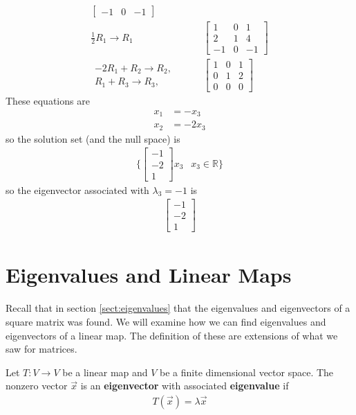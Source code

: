 \begin{example}
\begin{align*}
\begin{bmatrix}
-1 & 0 & -1 
\end{bmatrix} \\
\frac{1}{2}R_1 \rightarrow R_1 & \qquad
\begin{bmatrix}
1 & 0 & 1 \\
2 & 1 & 4 \\
-1 & 0 & -1 
\end{bmatrix} \\
\begin{array}{r}
-2R_1 + R_2 \rightarrow R_2, \\
R_1 + R_3 \rightarrow R_3,
\end{array}
& \qquad \begin{bmatrix}
1 & 0 & 1 \\
0 & 1 & 2 \\
0 & 0 & 0 
\end{bmatrix}
\end{align*}
These equations are 
%
\begin{align*}
x_1 & = -x_3 \\
x_2 & = -2x_3 
\end{align*}
so the solution set (and the null space) is
%
\begin{align*}
\{ \begin{bmatrix}
-1 \\ -2 \\ 1
\end{bmatrix} x_3 \; \ \; x_3 \in \mathbb{R} \} 
\end{align*}
so the eigenvector associated with $\lambda_3 =-1$ is
%
\begin{align*}
\begin{bmatrix}
-1 \\ -2 \\ 1
\end{bmatrix}
\end{align*}
\end{example}


\section{Eigenvalues and  Linear Maps}

Recall that in section \ref{sect:eigenvalues} that the eigenvalues and eigenvectors of a square matrix was found. We will examine how we can find eigenvalues and eigenvectors of a linear map.  The definition of these are extensions of what we saw for matrices.

\begin{definition}
Let $T:V \rightarrow V$ be a linear map and $V$ be a finite dimensional vector space.  The nonzero vector $\vec{x}$ is an \textbf{eigenvector} with associated \textbf{eigenvalue} if
%
\begin{align*}
T(\vec{x}) = \lambda \vec{x}
\end{align*}
\end{definition}

